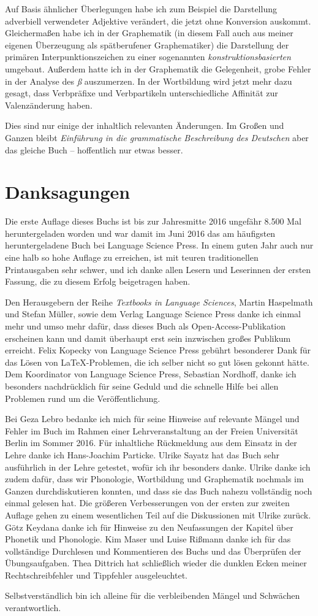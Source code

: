 Auf Basis ähnlicher Überlegungen habe ich zum Beispiel die Darstellung adverbiell verwendeter Adjektive verändert, die jetzt ohne Konversion auskommt.
Gleichermaßen habe ich in der Graphematik (in diesem Fall auch aus meiner eigenen Überzeugung als spätberufener Graphematiker) die Darstellung der primären Interpunktionszeichen zu einer sogenannten \textit{konstruktionsbasierten} umgebaut.
Außerdem hatte ich in der Graphematik die Gelegenheit, grobe Fehler in der Analyse des \textit{ß} auszumerzen.
In der Wortbildung wird jetzt mehr dazu gesagt, dass Verbpräfixe und Verbpartikeln unterschiedliche Affinität zur Valenzänderung haben.

Dies sind nur einige der inhaltlich relevanten Änderungen.
Im Großen und Ganzen bleibt \textit{Einführung in die grammatische Beschreibung des Deutschen} aber das gleiche Buch -- hoffentlich nur etwas besser.

\section*{Danksagungen}

Die erste Auflage dieses Buchs ist bis zur Jahresmitte 2016 ungefähr 8.500 Mal heruntergeladen worden und war damit im Juni 2016 das am häufigsten heruntergeladene Buch bei Language Science Press.
In einem guten Jahr auch nur eine halb so hohe Auflage zu erreichen, ist mit teuren traditionellen Printausgaben sehr schwer, und ich danke allen Lesern und Leserinnen der ersten Fassung, die zu diesem Erfolg beigetragen haben.

Den Herausgebern der Reihe \textit{Textbooks in Language Sciences}, Martin Haspelmath und Stefan Müller, sowie dem Verlag Language Science Press danke ich einmal mehr und umso mehr dafür, dass dieses Buch als Open-Access-Publikation erscheinen kann und damit überhaupt erst sein inzwischen großes Publikum erreicht.
Felix Kopecky von Language Science Press gebührt besonderer Dank für das Lösen von \LaTeX-Problemen, die ich selber nicht so gut lösen gekonnt hätte.
Dem Koordinator von Language Science Press, Sebastian Nordhoff, danke ich besonders nachdrücklich für seine Geduld und die schnelle Hilfe bei allen Problemen rund um die Veröffentlichung.

Bei Geza Lebro bedanke ich mich für seine Hinweise auf relevante Mängel und Fehler im Buch im Rahmen einer Lehrveranstaltung an der Freien Universität Berlin im Sommer 2016.
Für inhaltliche Rückmeldung aus dem Einsatz in der Lehre danke ich Hans-Joachim Particke.
Ulrike Sayatz hat das Buch sehr ausführlich in der Lehre getestet, wofür ich ihr besonders danke.
Ulrike danke ich zudem dafür, dass wir Phonologie, Wortbildung und Graphematik nochmals im Ganzen durchdiskutieren konnten, und dass sie das Buch nahezu vollständig noch einmal gelesen hat.
Die größeren Verbesserungen von der ersten zur zweiten Auflage gehen zu einem wesentlichen Teil auf die Diskussionen mit Ulrike zurück.
Götz Keydana danke ich für Hinweise zu den Neufassungen der Kapitel über Phonetik und Phonologie.
Kim Maser und Luise Rißmann danke ich für das vollständige Durchlesen und Kommentieren des Buchs und das Überprüfen der Übungsaufgaben.
Thea Dittrich hat schließlich wieder die dunklen Ecken meiner Rechtschreibfehler und Tippfehler ausgeleuchtet.

Selbstverständlich bin ich alleine für die verbleibenden Mängel und Schwächen verantwortlich.
